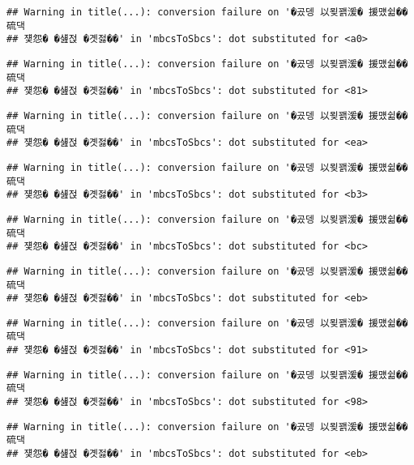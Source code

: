 \documentclass[
]{article}
\begin{document}
\begin{verbatim}
## Warning in title(...): conversion failure on '�곴뎅 以묒꽭湲� 援먰쉶�� 硫댁
## 쟻怨� �섎젅 �곗젏��' in 'mbcsToSbcs': dot substituted for <a0>
\end{verbatim}

\begin{verbatim}
## Warning in title(...): conversion failure on '�곴뎅 以묒꽭湲� 援먰쉶�� 硫댁
## 쟻怨� �섎젅 �곗젏��' in 'mbcsToSbcs': dot substituted for <81>
\end{verbatim}

\begin{verbatim}
## Warning in title(...): conversion failure on '�곴뎅 以묒꽭湲� 援먰쉶�� 硫댁
## 쟻怨� �섎젅 �곗젏��' in 'mbcsToSbcs': dot substituted for <ea>
\end{verbatim}

\begin{verbatim}
## Warning in title(...): conversion failure on '�곴뎅 以묒꽭湲� 援먰쉶�� 硫댁
## 쟻怨� �섎젅 �곗젏��' in 'mbcsToSbcs': dot substituted for <b3>
\end{verbatim}

\begin{verbatim}
## Warning in title(...): conversion failure on '�곴뎅 以묒꽭湲� 援먰쉶�� 硫댁
## 쟻怨� �섎젅 �곗젏��' in 'mbcsToSbcs': dot substituted for <bc>
\end{verbatim}

\begin{verbatim}
## Warning in title(...): conversion failure on '�곴뎅 以묒꽭湲� 援먰쉶�� 硫댁
## 쟻怨� �섎젅 �곗젏��' in 'mbcsToSbcs': dot substituted for <eb>
\end{verbatim}

\begin{verbatim}
## Warning in title(...): conversion failure on '�곴뎅 以묒꽭湲� 援먰쉶�� 硫댁
## 쟻怨� �섎젅 �곗젏��' in 'mbcsToSbcs': dot substituted for <91>
\end{verbatim}

\begin{verbatim}
## Warning in title(...): conversion failure on '�곴뎅 以묒꽭湲� 援먰쉶�� 硫댁
## 쟻怨� �섎젅 �곗젏��' in 'mbcsToSbcs': dot substituted for <98>
\end{verbatim}

\begin{verbatim}
## Warning in title(...): conversion failure on '�곴뎅 以묒꽭湲� 援먰쉶�� 硫댁
## 쟻怨� �섎젅 �곗젏��' in 'mbcsToSbcs': dot substituted for <eb>
\end{verbatim}
\end{document}
